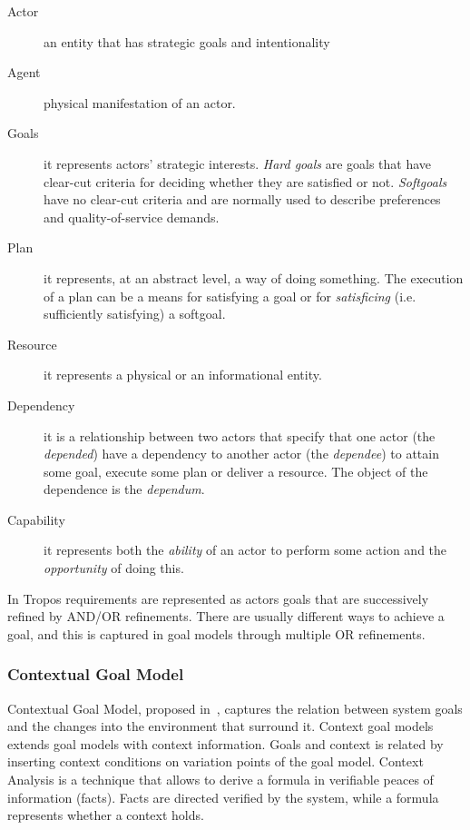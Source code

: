 \begin{description}%
  \item[Actor] an entity that has strategic goals and intentionality

  \item[Agent] physical manifestation of an actor.

  \item[Goals] it represents actors’ strategic interests. \emph{Hard goals} are goals that have clear-cut criteria for deciding whether they are satisfied or not. \emph{Softgoals} have no clear-cut criteria and are normally used to describe preferences and quality-of-service demands.

  \item[Plan] it represents, at an abstract level, a way of doing something. The execution of a plan can be a means for satisfying a goal or for \emph{satisficing} (i.e. sufficiently satisfying) a softgoal.

  \item[Resource]  it represents a physical or an informational entity.

  \item[Dependency] it is a relationship between two actors that specify that one actor (the \emph{depended}) have a dependency to another actor (the \emph{dependee}) to attain some goal, execute some plan or deliver a resource. The object of the dependence is the \emph{dependum}.

  \item[Capability] it represents both the \emph{ability} of an actor to perform some action and the \emph{opportunity} of doing this.

\end{description}


In Tropos requirements are represented as actors goals that are successively refined by AND/OR refinements. There are usually different ways to achieve a goal, and this is captured in goal models through multiple OR refinements.

\subsubsection{Contextual Goal Model}

Contextual Goal Model, proposed in~\cite{ali_goal-based_2010}, captures the relation between system goals and the changes into the environment that surround it. Context goal models extends goal models with context information. Goals and context is related by inserting context conditions on variation points of the goal model. Context Analysis is a technique that allows to derive a formula in verifiable peaces of information (facts). Facts are directed verified by the system, while a formula represents whether a context holds.

